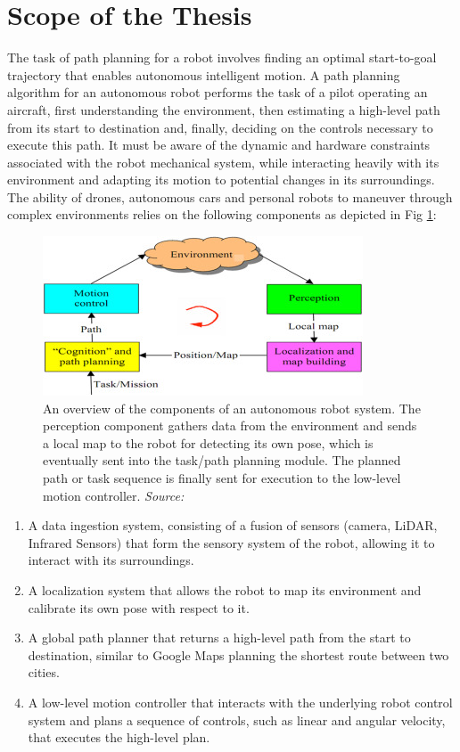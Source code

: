 \section{Scope of the Thesis}

The task of path planning for a robot involves finding an optimal start-to-goal trajectory that enables autonomous intelligent motion. A path planning algorithm for an autonomous robot performs the task of a pilot operating an aircraft, first understanding the environment, then estimating a high-level path from its start to destination and, finally, deciding on the controls necessary to execute this path. It must be aware of the dynamic and hardware constraints associated with the robot mechanical system, while interacting heavily with its environment and adapting its motion to potential changes in its surroundings. The ability of drones, autonomous cars and personal robots to maneuver through complex environments relies on the following components as depicted in Fig \ref{fig:intro_overview_robot}:

\begin{figure}[ht]
    \centering
    \includegraphics{figures/intro/overview_robot.jpg}
    \caption[Overview of Autonomous Robot Systems]{An overview of the components of an autonomous robot system. The perception component gathers data from the environment and sends a local map to the robot for detecting its own pose, which is eventually sent into the task/path planning module. The planned path or task sequence is finally sent for execution to the low-level motion controller. \textit{Source: \cite{overview_robot}}}
    \label{fig:intro_overview_robot}
\end{figure}

\begin{enumerate}
    \item A data ingestion system, consisting of a fusion of sensors (camera, LiDAR, Infrared Sensors) that form the sensory system of the robot, allowing it to interact with its surroundings. 
    \item A localization system that allows the robot to map its environment and calibrate its own pose with respect to it.
    \item\label{item:global-planning} A global path planner that returns a high-level path from the start to destination, similar to Google Maps planning the shortest route between two cities.
    \item\label{item:local-planning} A low-level motion controller that interacts with the underlying robot control system and plans a sequence of controls, such as linear and angular velocity, that executes the high-level plan.
\end{enumerate}

